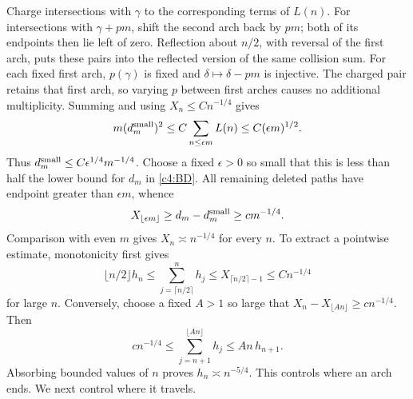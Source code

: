 Charge intersections with $\gamma$ to the corresponding terms of
$L(n)$. For intersections with $\gamma+pm$, shift the second arch
back by $pm$; both of its endpoints then lie left of zero.
Reflection about $n/2$, with reversal of the first arch, puts these
pairs into the reflected version of the same collision sum.
For each fixed first arch, $p(\gamma)$ is fixed and
$\delta\mapsto\delta-pm$ is injective. The charged pair retains
that first arch, so varying $p$ between first arches causes no
additional multiplicity. Summing and using $X_n\le Cn^{-1/4}$ gives
\[
       m(d_m^{\rm small})^2\le C\sum_{n\le\epsilon m} L(n)
          \le C(\epsilon m)^{1/2}.
\]
Thus $d_m^{\rm small}\le C\epsilon^{1/4}m^{-1/4}$. Choose a fixed
$\epsilon>0$ so small that this is less than half the lower bound for
$d_m$ in \eqref{c4:BD}. All remaining deleted paths have endpoint greater
than $\epsilon m$, whence
\[
 X_{\lfloor\epsilon m\rfloor}\ge d_m-d_m^{\rm small}
                         \ge c m^{-1/4}.
\]
Comparison with even $m$ gives $X_n\asymp n^{-1/4}$ for every $n$.
To extract a pointwise estimate, monotonicity first gives
\[
 \lfloor n/2\rfloor h_n
       \le\sum_{j=\lceil n/2\rceil}^{n}h_j
       \le X_{\lceil n/2\rceil-1}\le Cn^{-1/4}
\]
for large $n$. Conversely, choose a fixed $A>1$ so large that
$X_n-X_{\lfloor An\rfloor}\ge c n^{-1/4}$. Then
\[
 c n^{-1/4}\le\sum_{j=n+1}^{\lfloor An\rfloor}h_j
                  \le An\,h_{n+1}.
\]
Absorbing bounded values of $n$ proves $h_n\asymp n^{-5/4}$.
This controls where an arch ends. We next control where it travels.

